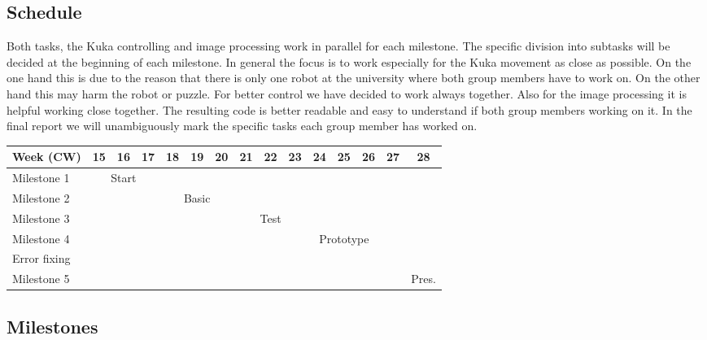 \documentclass[a4paper, 12pt]{scrartcl}%
\begin{document}
	\subsection*{Schedule}
	Both tasks, the Kuka controlling and image processing work in parallel for each milestone. The specific division into subtasks will be decided at the beginning of each milestone. In general the focus is to work especially for the Kuka movement as close as possible. On the one hand this is due to the reason that there is only one robot at the university where both group members have to work on. On the other hand this may harm the robot or puzzle. For better control we have decided to work always together.\newline
	Also for the image processing it is helpful working close together. The resulting code is better readable and easy to understand if both group members working on it.\newline
	In the final report we will unambiguously mark the specific tasks each group member has worked on.
	\begin{center}
		\begin{footnotesize}
			\begin{tabular}{|l|c|c|c|c|c|c|c|c|c|c|c|c|c|c|}
				\hline
				Week (CW) & 15 & 16 & 17 & 18 & 19 & 20 & 21 & 22 & 23 & 24 & 25 & 26 & 27 & 28 \\
				\hline
				Milestone 1      & \multicolumn{3}{c|}{Start}&\multicolumn{11}{c|}{}\\
				\hline
				Milestone 2      & \multicolumn{3}{c|}{}&\multicolumn{3}{c|}{Basic}&\multicolumn{8}{c|}{}\\
				\hline
				Milestone 3      & \multicolumn{6}{c|}{}&\multicolumn{3}{c|}{Test}&\multicolumn{5}{c|}{}\\
				\hline
				Milestone 4      & \multicolumn{9}{c|}{}&\multicolumn{3}{c|}{Prototype}&\multicolumn{2}{c|}{}\\
				\hline
				Error fixing     & \multicolumn{12}{c|}{}&\multicolumn{1}{c|}{}&\multicolumn{1}{c|}{}\\
				\hline
				Milestone 5      & \multicolumn{13}{c|}{}&\multicolumn{1}{c|}{Pres.}\\
				\hline
			\end{tabular}
		\end{footnotesize}
	\end{center}
	
	\subsection{Milestones}
\end{document}
